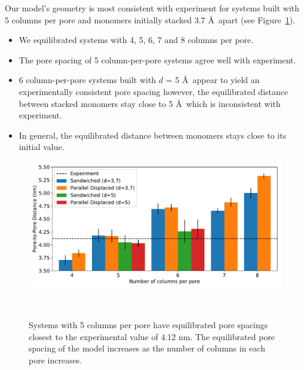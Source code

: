 \documentclass{article}
\begin{document}
  \noindent Our model's geometry is most consistent with experiment for systems
  built with 5 columns per pore and monomers initially stacked 3.7 \AA~apart
  (see Figure~\ref{fig:p2p}). 
  \begin{itemize}
    \item We equilibrated systems with 4, 5, 6, 7 and 8 columns per pore.
    \item The pore spacing of 5 column-per-pore systems agree well with experiment.
    \item 6 column-per-pore systems built with $d$ = 5 \AA~appear to yield an
    experimentally consistent pore spacing however, the equilibrated distance
    between stacked monomers stay close to 5 \AA~which is inconsistent with 
    experiment. 
    \item In general, the equilibrated distance between monomers stays close to
    its initial value. 
  \end{itemize}
  
  \begin{figure}[!htb]
    \centering
    \includegraphics[width=\linewidth]{p2p.pdf}
    \caption{Systems with 5 columns per pore have equilibrated pore spacings
            closest to the experimental value of 4.12 nm. The equilibrated 
            pore spacing of the model increases as the number of columns in
            each pore increases.}~\label{fig:p2p}
  \end{figure}
  
\end{document}
